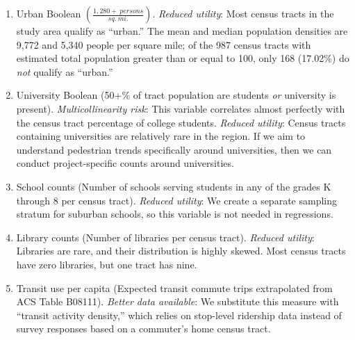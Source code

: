 \documentclass[paper=letterpaper, fontsize=11pt]{scrartcl}
\begin{document}
\begin{enumerate}[itemsep=-4pt]
	\item Urban Boolean $\left(\frac{1,280+\:persons}{sq.\:mi.}\right)$. \textit{Reduced utility}: Most census tracts in the study area qualify as ``urban.'' The mean and median population densities are 9,772 and 5,340 people per square mile; of the 987 census tracts with estimated total population greater than or equal to 100, only 168 (17.02\%) do \textit{not} qualify as ``urban.''
	\item University Boolean (50+\% of tract population are students \textit{or} university is present). \textit{Multicollinearity risk}: This variable correlates almost perfectly with the census tract percentage of college students. \textit{Reduced utility}: Census tracts containing universities are relatively rare in the region. If we aim to understand pedestrian trends specifically around universities, then we can conduct project-specific counts around universities.
	\item School counts (Number of schools serving students in any of the grades K through 8 per census tract). \textit{Reduced utility}: We create a separate sampling stratum for suburban schools, so this variable is not needed in regressions.
	\item Library counts (Number of libraries per census tract). \textit{Reduced utility}: Libraries are rare, and their distribution is highly skewed. Most census tracts have zero libraries, but one tract has nine.
	\item Transit use per capita (Expected transit commute trips extrapolated from ACS Table B08111). \textit{Better  data available}: We substitute this measure with ``transit activity density,'' which relies on stop-level ridership data instead of survey responses based on a commuter's home census tract.
\end{enumerate}
\end{document}
